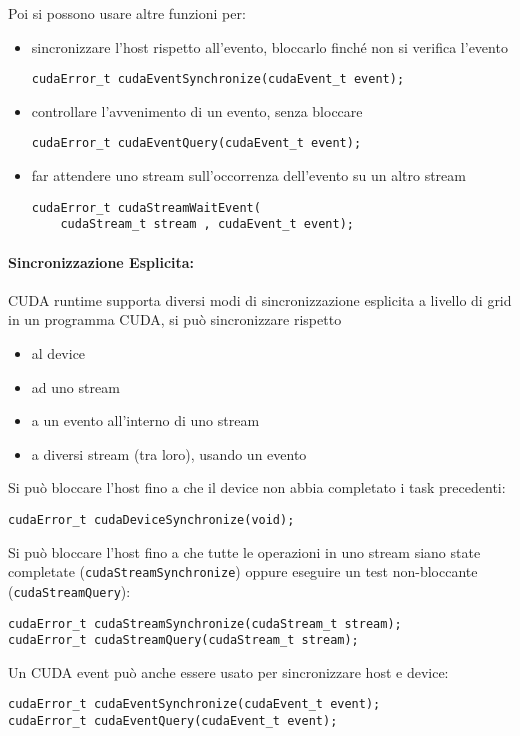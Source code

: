 Poi si possono usare altre funzioni per:
\begin{itemize}
	\item sincronizzare l'host rispetto all'evento, bloccarlo finché non si verifica l'evento
	\begin{verbatim}
cudaError_t cudaEventSynchronize(cudaEvent_t event);
	\end{verbatim}
	\item controllare l'avvenimento di un evento, senza bloccare
	\begin{verbatim}
cudaError_t cudaEventQuery(cudaEvent_t event);
	\end{verbatim}
	\item far attendere uno stream sull'occorrenza dell'evento su un altro stream
	\begin{verbatim}
cudaError_t cudaStreamWaitEvent(
	cudaStream_t stream , cudaEvent_t event);
	\end{verbatim}
\end{itemize}

\newpage

\paragraph{Sincronizzazione Esplicita:} CUDA runtime supporta diversi modi di sincronizzazione esplicita a livello di grid in un programma CUDA, si può sincronizzare rispetto
\begin{itemize}
	\item al device
	\item ad uno stream
	\item a un evento all'interno di uno stream
	\item a diversi stream (tra loro), usando un evento
\end{itemize}

Si può bloccare l'host fino a che il device non abbia completato i task precedenti:
\begin{verbatim}
cudaError_t cudaDeviceSynchronize(void);
\end{verbatim}

Si può bloccare l'host fino a che tutte le operazioni in uno stream siano state completate (\texttt{cudaStreamSynchronize}) oppure eseguire un test non-bloccante (\texttt{cudaStreamQuery}):
\begin{verbatim}
cudaError_t cudaStreamSynchronize(cudaStream_t stream);
cudaError_t cudaStreamQuery(cudaStream_t stream);
\end{verbatim}

Un CUDA event può anche essere usato per sincronizzare host e device:
\begin{verbatim}
cudaError_t cudaEventSynchronize(cudaEvent_t event);
cudaError_t cudaEventQuery(cudaEvent_t event);
\end{verbatim}

